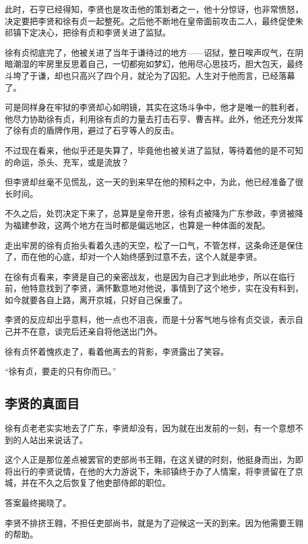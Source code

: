 \begin{multicols}{\theparacolNo}
此时，石亨已经得知，李贤也是攻击他的策划者之一，他十分惊讶，也非常愤怒，决定要把李贤和徐有贞一起整死。之后他不断地在皇帝面前攻击二人，最终促使朱祁镇下定决心，把徐有贞和李贤关进了监狱。

徐有贞彻底完了，他被关进了当年于谦待过的地方——诏狱，整日唉声叹气，在阴暗潮湿的牢房里反思着自己，一切都宛如梦幻，他用尽心思技巧，胆大包天，最终斗垮了于谦，却也只高兴了四个月，就沦为了囚犯。人生对于他而言，已经落幕了。

可是同样身在牢狱的李贤却心如明镜，其实在这场斗争中，他才是唯一的胜利者，他尽力协助徐有贞，利用徐有贞的力量去打击石亨、曹吉祥。此外，他还充分发挥了徐有贞的盾牌作用，避过了石亨等人的反击。

不过现在看来，他似乎还是失算了，毕竟他也被关进了监狱，等待着他的是不可知的命运，杀头、充军，或是流放？

但李贤却丝毫不见慌乱，这一天的到来早在他的预料之中，为此，他已经准备了很长时间。

不久之后，处罚决定下来了，总算是皇帝开恩，徐有贞被降为广东参政，李贤被降为福建参政，这两个地方在当时都是偏远地区，也算是一种体面的发配。

走出牢房的徐有贞抬头看着久违的天空，松了一口气，不管怎样，这条命还是保住了，而在他的心底，却对一个人始终感到过意不去，这个人就是李贤。

在徐有贞看来，李贤是自己的亲密战友，也是因为自己才到此地步，所以在临行前，他特意找到了李贤，满怀歉意地对他说，事情到了这个地步，实在没有料到，如今就要各自上路，离开京城，只好自己保重了。

李贤的反应却出乎意料，他一点也不沮丧，而是十分客气地与徐有贞交谈，表示自己并不在意，谈完后还亲自将他送出门外。

徐有贞怀着愧疚走了，看着他离去的背影，李贤露出了笑容。

“徐有贞，要走的只有你而已。”

\subsection{李贤的真面目}
徐有贞老老实实地去了广东，李贤却没有，因为就在出发前的一刻，有一个意想不到的人站出来说话了。

这个人正是那位差点被罢官的吏部尚书王翱，在这关键的时刻，他挺身而出，为即将出行的李贤说情，在他的大力游说下，朱祁镇终于办了人情案，将李贤留在了京城，并在不久之后恢复了他吏部侍郎的职位。

答案最终揭晓了。

李贤不排挤王翱，不担任吏部尚书，就是为了迎候这一天的到来。因为他需要王翱的帮助。


\end{multicols}
